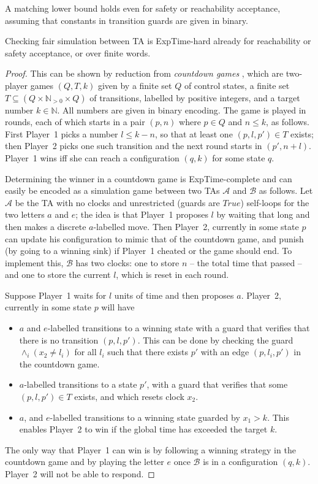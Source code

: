 \documentclass[10pt,a4paper]{amsart}
\theoremstyle{definition}
\numberwithin{equation}{section}
\newcommand{\N}{\mathbb{N}}
\newcommand{\x}{\times}
\newcommand{\auta}{\mathcal{A}}
\newcommand{\autb}{\mathcal{B}}
\newcommand{\exptime}{\EXPTIME}
\newcommand{\EXPTIME}{{\sc ExpTime}}
\begin{document}
A matching lower bound holds even for safety or reachability acceptance, assuming that constants in transition guards are given in binary.
\begin{lemma}
    \label{lem:GFGTA:fairsim-lb}
    Checking fair simulation between TA is \exptime-hard already for reachability or safety acceptance, or over finite words.
\end{lemma}
\begin{proof}
This can be shown by reduction from \emph{countdown games} \cite{JLS2008},
which are two-player games $(Q,T,k)$ given by a finite set $Q$ of control states, a finite set $T \subseteq (Q \x \N_{>0} \x Q)$ of transitions, labelled by positive integers, and a target number $k\in\N$.
All numbers are given in binary encoding.
The game is played in rounds, each of which starts in a pair $(p,n)$ where $p\in Q$ and $n \le k$,
as follows.
First Player~1 picks a number $l \le k-n$, so that at least one $(p,l,p')\in T$ exists;
then Player~2 picks one such transition and the next round starts in $(p',n+l)$.
Player~1 wins iff she can reach a configuration $(q,k)$ for some state $q$.

Determining the winner in a countdown game is \exptime-complete \cite{JLS2008}
and can easily be encoded as a simulation game between two TAs $\auta$ and $\autb$ as follows.
Let $\auta$ be the TA with no clocks and unrestricted (guards are $\mathit{True}$) self-loops 
for the two letters $a$ and $e$;
the idea is that Player~1 proposes $l$ by waiting that long and then makes a discrete $a$-labelled move.
Then Player~2, currently in some state $p$ can update his configuration to mimic that of the countdown game,
and punish (by going to a winning sink) if Player~1 cheated or the game should end.
To implement this, $\autb$ has two clocks: one to store $n$ -- the total time that passed -- and one to store the current $l$, which is reset in each round.

Suppose Player~1 waits for $l$ units of time and then proposes $a$. 
Player~2, currently in some state $p$ 
will have 
\begin{itemize}
    \item 
$a$ and $e$-labelled transitions to a winning state with a guard that verifies that
there is no transition $(p,l,p')$. 
This can be done by checking the guard $\wedge_{i} (x_2\neq l_i)$ for 
all $l_i$ such that there exists $p'$ with an edge $(p,l_i,p')$ in the countdown game.
\item $a$-labelled transitions to a state $p'$, with a guard that verifies that 
some $(p,l,p')\in T$ exists, and which resets clock $x_2$.
\item $a$, and $e$-labelled transitions to a winning state guarded by $x_1>k$.
    This enables Player~2 to win if the global time has exceeded the target $k$.
\end{itemize}
The only way that Player~1 can win is by following a winning strategy in the countdown game
and by playing the letter $e$ once $\autb$ is in a configuration $(q,k)$.
Player~2 will not be able to respond.
\end{proof}
\end{document}
